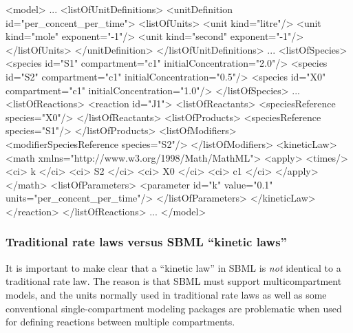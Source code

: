 \begin{example}
<model>
    ...
    <listOfUnitDefinitions>
        <unitDefinition id="per_concent_per_time">
            <listOfUnits>
                <unit kind="litre"/>
                <unit kind="mole"   exponent="-1"/>
                <unit kind="second" exponent="-1"/>
            </listOfUnits>
        </unitDefinition>
    </listOfUnitDefinitions>
    ...
    <listOfSpecies>
        <species id="S1" compartment="c1" initialConcentration="2.0"/>
        <species id="S2" compartment="c1" initialConcentration="0.5"/>
        <species id="X0" compartment="c1" initialConcentration="1.0"/>
    </listOfSpecies>
    ...
    <listOfReactions>
        <reaction id="J1">
            <listOfReactants>
                <speciesReference species="X0"/>
            </listOfReactants>
            <listOfProducts>
                <speciesReference species="S1"/>
            </listOfProducts>
            <listOfModifiers>
                <modifierSpeciesReference species="S2"/>
            </listOfModifiers>
            <kineticLaw>
                <math xmlns="http://www.w3.org/1998/Math/MathML">
                    <apply>
                        <times/> <ci> k </ci> <ci> S2 </ci> <ci> X0 </ci> <ci> c1 </ci>
                    </apply>
                </math>
                <listOfParameters>
                    <parameter id="k" value="0.1" units="per_concent_per_time"/>
                </listOfParameters>
            </kineticLaw>
        </reaction>
    </listOfReactions>
    ...
</model>
\end{example}



\subsubsection{Traditional rate laws versus SBML ``kinetic laws''}
\label{sec:about-kinetic-laws}


It is important to make clear that a ``kinetic law'' in SBML is
\emph{not} identical to a traditional rate law.  The reason is
that SBML must support multicompartment models, and the units
normally used in traditional rate laws as well as some conventional
single-compartment modeling packages are problematic when used for
defining reactions between multiple compartments.

